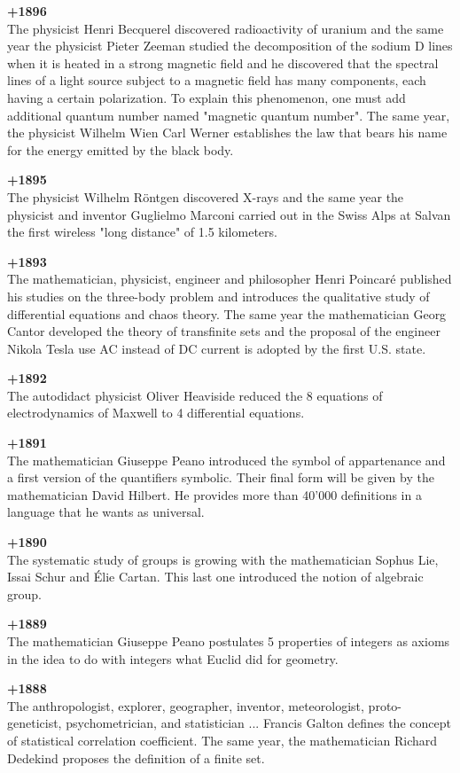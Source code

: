 \textbf{+1896}\\
The physicist Henri Becquerel discovered radioactivity of uranium and the same year the physicist Pieter Zeeman studied the decomposition of the sodium D lines when it is heated in a strong magnetic field and he discovered that the spectral lines of a light source subject to a magnetic field has many components, each having a certain polarization. To explain this phenomenon, one must add additional quantum number named "magnetic quantum number". The same year, the physicist Wilhelm Wien Carl Werner establishes the law that bears his name for the energy emitted by the black body.

\textbf{+1895}\\
The physicist Wilhelm Röntgen discovered X-rays and the same year the physicist and inventor Guglielmo Marconi carried out in the Swiss Alps at Salvan the first wireless "long distance" of 1.5 kilometers.

\textbf{+1893}\\
The mathematician, physicist, engineer and philosopher Henri Poincaré published his studies on the three-body problem and introduces the qualitative study of differential equations and chaos theory. The same year the mathematician Georg Cantor developed the theory of transfinite sets and the proposal of the engineer Nikola Tesla use AC instead of DC current is adopted by the first U.S. state.

\textbf{+1892}\\
The autodidact physicist Oliver Heaviside reduced the 8 equations of electrodynamics of Maxwell to 4 differential equations. 

\textbf{+1891}\\
The mathematician Giuseppe Peano introduced the symbol of appartenance and a first version of the quantifiers symbolic. Their final form will be given by the mathematician David Hilbert. He provides more than 40'000 definitions in a language that he wants as universal.

\textbf{+1890}\\
The systematic study of groups is growing with the mathematician Sophus Lie, Issai Schur and Élie Cartan. This last one introduced the notion of algebraic group. 

\textbf{+1889}\\
The mathematician Giuseppe Peano postulates 5 properties of integers as axioms in the idea to do with integers what Euclid did for geometry. 

\textbf{+1888}\\
The anthropologist, explorer, geographer, inventor, meteorologist, proto-geneticist, psychometrician, and statistician ... Francis Galton defines the concept of statistical correlation coefficient. The same year, the mathematician Richard Dedekind proposes the definition of a finite set. 

